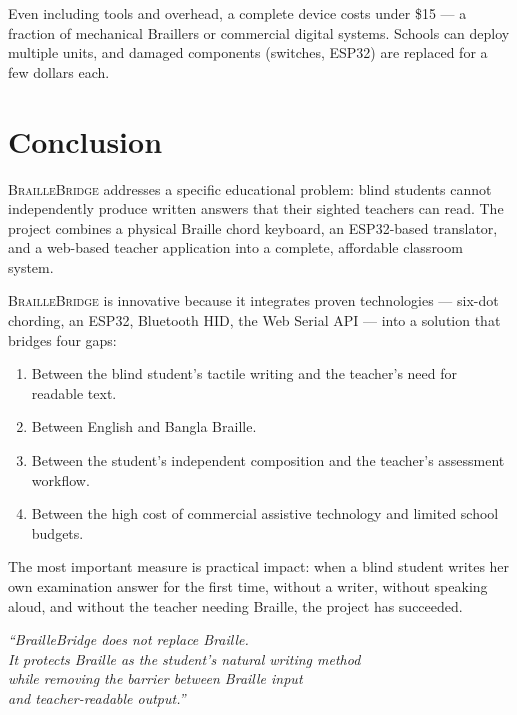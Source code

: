 \documentclass[11pt,a4paper,twoside]{article}
\newcommand{\projectname}{\textsc{BrailleBridge}}
\begin{document}
Even including tools and overhead, a complete device costs under \$15 --- a
fraction of mechanical Braillers or commercial digital systems. Schools can
deploy multiple units, and damaged components (switches, ESP32) are replaced
for a few dollars each.

\section{Conclusion}

\projectname{} addresses a specific educational problem: blind students
cannot independently produce written answers that their sighted teachers
can read. The project combines a physical Braille chord keyboard, an
ESP32-based translator, and a web-based teacher application into a
complete, affordable classroom system.

\projectname{} is innovative because it integrates proven technologies ---
six-dot chording, an ESP32, Bluetooth HID, the Web Serial API --- into a
solution that bridges four gaps:

\begin{enumerate}[nosep]
  \item Between the blind student's tactile writing and the teacher's
    need for readable text.
  \item Between English and Bangla Braille.
  \item Between the student's independent composition and the teacher's
    assessment workflow.
  \item Between the high cost of commercial assistive technology and
    limited school budgets.
\end{enumerate}

The most important measure is practical impact: when a blind student writes
her own examination answer for the first time, without a writer, without
speaking aloud, and without the teacher needing Braille, the project has
succeeded.

\vspace{1cm}\begin{center}
\itshape\large``BrailleBridge does not replace Braille.\\
It protects Braille as the student's natural writing method\\
while removing the barrier between Braille input\\
and teacher-readable output.''
\end{center}
\end{document}
